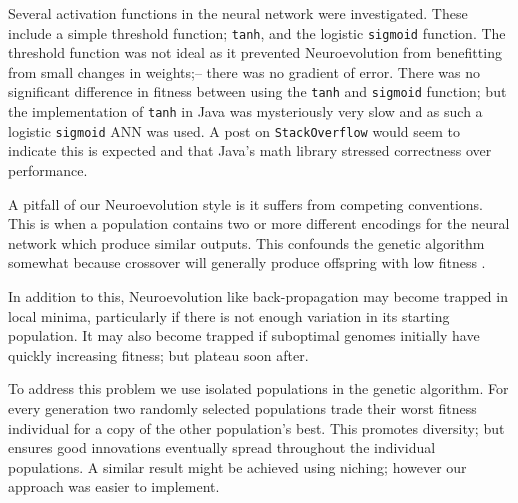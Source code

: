 Several activation functions in the neural network were investigated. These include a simple threshold function; \texttt{tanh}, and the logistic \texttt{sigmoid} function. The threshold function was not ideal as it prevented Neuroevolution from benefitting from small changes in weights;-- there was no gradient of error. There was no significant difference in fitness between using the \texttt{tanh} and \texttt{sigmoid} function; but the implementation of \texttt{tanh} in Java was mysteriously very slow and as such a logistic \texttt{sigmoid} ANN was used. A post on \texttt{StackOverflow} \cite{slowtanh} would seem to indicate this is expected and that Java's math library stressed correctness over performance.

A pitfall of our Neuroevolution style is it suffers from competing conventions. This is when a population contains two or more different encodings for the neural network which produce similar outputs. This confounds the genetic algorithm somewhat because crossover will generally produce offspring with low fitness \cite{mattiussi2011beyond}.

In addition to this, Neuroevolution like back-propagation may become trapped in local minima, particularly if there is not enough variation in its starting population. It may also become trapped if suboptimal genomes initially have quickly increasing fitness; but plateau soon after.

To address this problem we use isolated populations in the genetic algorithm. For every generation two randomly selected populations trade their worst fitness individual for a copy of the other population's best. This promotes diversity; but ensures good innovations eventually spread throughout the individual populations. A similar result might be achieved using niching; however our approach was easier to implement.


